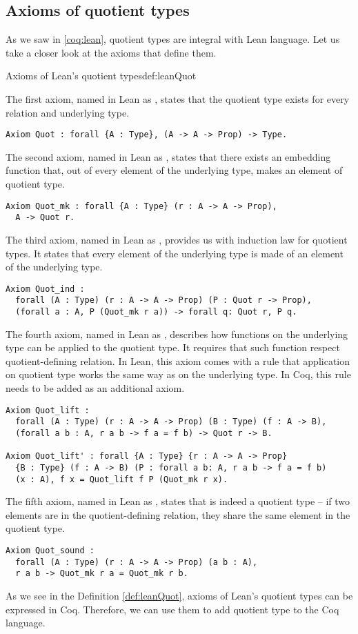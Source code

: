 \subsection{Axioms of quotient types}
As we saw in \ref{coq:lean}, quotient types are integral with Lean language. Let us take a closer look at the axioms that define them.
\begin{defi}{Axioms of Lean's quotient types}{def:leanQuot}

The first axiom, named in Lean as , states that the quotient type exists for every relation and underlying type.
\begin{verbatim}
Axiom Quot : forall {A : Type}, (A -> A -> Prop) -> Type.
\end{verbatim}
The second axiom, named in Lean as , states that there exists an embedding function that, out of every element of the underlying type, makes an element of quotient type.
\begin{verbatim}
Axiom Quot_mk : forall {A : Type} (r : A -> A -> Prop), 
  A -> Quot r.
\end{verbatim}
The third axiom, named in Lean as , provides us with induction law for quotient types. It states that every element of the underlying type is made of an element of the underlying type.
\begin{verbatim}
Axiom Quot_ind : 
  forall (A : Type) (r : A -> A -> Prop) (P : Quot r -> Prop),
  (forall a : A, P (Quot_mk r a)) -> forall q: Quot r, P q.
\end{verbatim}
The fourth axiom, named in Lean as , describes how functions on the underlying type can be applied to the quotient type. It requires that such function respect quotient-defining relation. In Lean, this axiom comes with a rule that application on quotient type works the same way as on the underlying type. In Coq, this rule needs to be added as an additional axiom.
\begin{verbatim}
Axiom Quot_lift :
  forall (A : Type) (r : A -> A -> Prop) (B : Type) (f : A -> B),
  (forall a b : A, r a b -> f a = f b) -> Quot r -> B.

Axiom Quot_lift' : forall {A : Type} {r : A -> A -> Prop} 
  {B : Type} (f : A -> B) (P : forall a b: A, r a b -> f a = f b) 
  (x : A), f x = Quot_lift f P (Quot_mk r x).
\end{verbatim}
The fifth axiom, named in Lean as , states that  is indeed a quotient type -- if two elements are in the quotient-defining relation, they share the same element in the quotient type.
\begin{verbatim}
Axiom Quot_sound :
  forall (A : Type) (r : A -> A -> Prop) (a b : A),
  r a b -> Quot_mk r a = Quot_mk r b.
\end{verbatim}
\end{defi}
As we see in the Definition \ref{def:leanQuot}, axioms of Lean's quotient types can be expressed in Coq. Therefore, we can use them to add quotient type to the Coq language.

